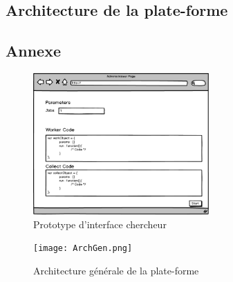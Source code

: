 \documentclass[a4paper]{article}
\begin{document}
\subsection{Architecture de la plate-forme}




\subsection{Annexe}
\begin{figure}
\centering
\includegraphics[width=0.6\textwidth]{IntChercheur.png}
\caption{\label{fig:IntChercheur}Prototype d'interface chercheur}
\end{figure}

\begin{figure}
\centering
\texttt{[image: ArchGen.png]}
\caption{\label{fig:ArchGenarale}Architecture générale de la plate-forme}
\end{figure}
\end{document}
